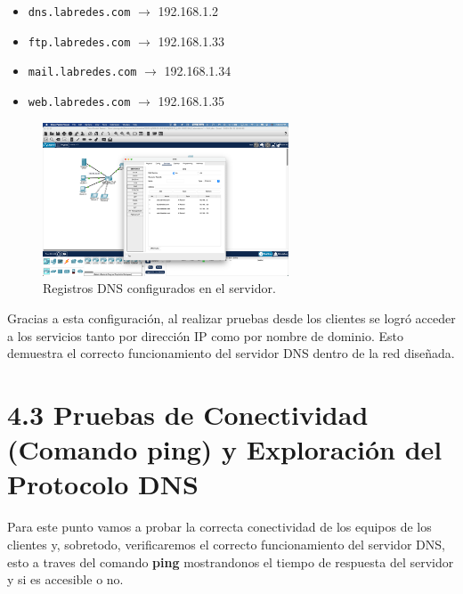 \documentclass[10pt]{article}
\begin{document}
\begin{itemize}
    \item \texttt{dns.labredes.com} $\rightarrow$ 192.168.1.2
    \item \texttt{ftp.labredes.com} $\rightarrow$ 192.168.1.33
    \item \texttt{mail.labredes.com} $\rightarrow$ 192.168.1.34
    \item \texttt{web.labredes.com} $\rightarrow$ 192.168.1.35
\end{itemize}

\begin{figure}[H]
    \centering
    \includegraphics[width=0.65\textwidth]{lab-01-screenshots/42-1-DNS-config.png}
    \caption{Registros DNS configurados en el servidor.}
\end{figure}

\bigskip
Gracias a esta configuración, al realizar pruebas desde los clientes se logró acceder a los servicios tanto por dirección IP como por nombre de dominio. Esto demuestra el correcto funcionamiento del servidor DNS dentro de la red diseñada.


\section{4.3 Pruebas de Conectividad (Comando ping) y Exploración del Protocolo DNS}

Para este punto vamos a probar la correcta conectividad de los equipos de los clientes y, sobretodo, verificaremos el correcto funcionamiento del servidor DNS, esto a traves del comando \textbf{ping} mostrandonos el tiempo de respuesta del servidor y si es accesible o no.
\end{document}
